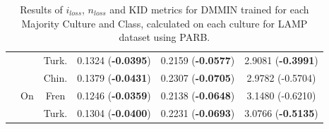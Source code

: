 \begin{table}[]
\begin{tabular}{c|c|c|c|c|c}
 &  & Turk.    & 0.1324 (\textbf{-0.0395})       & 0.2159 (\textbf{-0.0577})       & 2.9081 (\textbf{-0.3991})    \\
\hhline{~-----}
 & \multirow{3}{*}{On} & Chin.    & 0.1379 (\textbf{-0.0431})       & 0.2307 (\textbf{-0.0705})       & 2.9782 (-0.5704)  \\
 &  & Fren     & 0.1246 (\textbf{-0.0359})       & 0.2138 (\textbf{-0.0648})       & 3.1480 (-0.6210)    \\
 &  & Turk.    & 0.1304 (\textbf{-0.0400})       & 0.2231 (\textbf{-0.0693})       & 3.0766 (\textbf{-0.5135})  \\
\bottomrule
    \end{tabular}
    \caption{Results of $i_{loss}$, $n_{loss}$ and KID metrics for DMMIN trained for each Majority Culture and Class, calculated on each culture for LAMP dataset using PARB.}
    \label{ch3:tab:genDMMINPARB}
\end{table}
%
%
